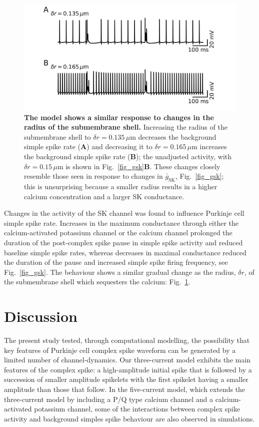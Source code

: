\documentclass[twocolumn]{svjour3}          %
\newcommand{\sk}{\mathrm{SK}}
\begin{document}
\begin{figure}[!ht]
  \includegraphics[width=\linewidth]{figure_delta_r.jpg}
\caption{\textbf{The model shows a similar response to changes in the
    radius of the submembrane shell.}  Increasing the radius of the
  submembrane shell to $\delta r=0.135\,\mu$m decreases the background
  simple spike rate (\textbf{A}) and decreasing it to $\delta
  r=0.165\,\mu$m increases the background simple spike rate
  (\textbf{B}); the unadjusted activity, with $\delta r=0.15\,\mu$m is
  shown in Fig.~\ref{fig_gsk}\textbf{B}. These changes closely
  resemble those seen in response to changes in $\bar{g}_\sk$,
  Fig.~\ref{fig_gsk}; this is unsurprising because a smaller radius
  results in a higher calcium concentration and a larger SK
  conductance.}
\label{fig_delta_r}
\end{figure}

Changes in the activity of the SK channel was found to influence
Purkinje cell simple spike rate. Increases in the maximum conductance
through either the calcium-activated potassium channel or the calcium
channel prolonged the duration of the post-complex spike pause in
simple spike activity and reduced baseline simple spike rates, whereas
decreases in maximal conductance reduced the duration of the pause and
increased simple spike firing frequency, see Fig.~\ref{fig_gsk}. The
behaviour shows a similar gradual change as the radius, $\delta r$, of the submembrane shell which sequesters the calcium: Fig.~\ref{fig_delta_r}.

\section{Discussion}

The present study tested, through computational modelling, the
possibility that key features of Purkinje cell complex spike waveform
can be generated by a limited number of channel-dynamics. Our
three-current model exhibits the main features of the complex spike: a
high-amplitude initial spike that is followed by a succession of
smaller amplitude spikelets with the first spikelet having a smaller
amplitude than those that follow. In the five-current model, which
extends the three-current model by including a P/Q type calcium
channel and a calcium-activated potassium channel, some of the
interactions between complex spike activity and background simples
spike behaviour are also observed in simulations.
\end{document}
